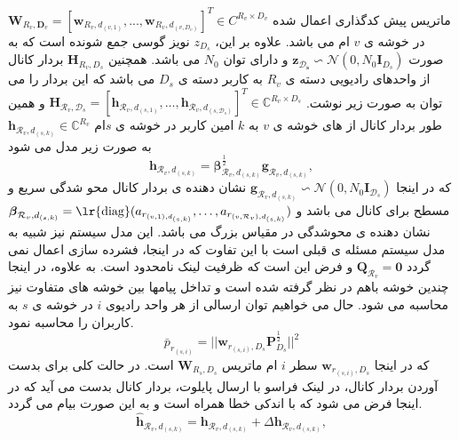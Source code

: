   $\boldsymbol{W}_{R_v, \boldsymbol{D}_v} = [\boldsymbol{w}_{ R_v,d_{(v,1)}},..., \boldsymbol{w}_{R_v, d_{(v,D_v)}}]^T \in C^{ R_v \times D_v} $ 
  ماتریس پیش کدگذاری اعمال شده در خوشه ی $v$ ام می باشد.
 علاوه بر این، $z_{D_s}$ نویز گوسی جمع شونده است که به صورت 
 $\boldsymbol{z_{\mathcal{D}_s}} \backsim \mathcal{N}(0,N_0\boldsymbol{I}_{{D}_s})$ 
و دارای توان $N_0$
می باشد.
همچنین $\boldsymbol{H}_{R_v,D_s}$ بردار کانال از واحدهای رادیویی دسته ی $R_v$ به کاربر دسته ی $D_s$ می باشد که این بردار را می توان به صورت زیر نوشت.
 $\boldsymbol{H}_{\mathcal{R}_v,\mathcal{D}_s}=\left[\boldsymbol{h}_{\mathcal{R}_v,d_{(s,1)}},\ldots,\boldsymbol{h}_{\mathcal{R}_v,d_{(s,\mathcal{D}_s)}}\right]^T  \in \mathbb{C}^{{R}_v\times {D}_s}$ 
 و همین طور
 بردار کانال از  های خوشه ی  $v$ به $k$ امین کاربر در خوشه ی $s$ام  
 $\boldsymbol{h}_{\mathcal{R}_v,d_{(s,k)}}\in \mathbb{C}^{{R}_v}$
 به صورت زیر مدل می شود
 \begin{equation}\label{channel}
\boldsymbol{h}_{\mathcal{R}_v,d_{(s,k)}} = \boldsymbol{\beta}^\frac{1}{2}_{\mathcal{R}_v,d_{(s,k)}} \boldsymbol{g}_{\mathcal{R}_v,d_{(s,k)}},
\end{equation}
که  در اینجا $\boldsymbol{g}_{\mathcal{R}_v,d_{(s,k)}} \backsim \mathcal{N}(0,N_0\boldsymbol{I}_{\mathcal{D}_s})$ نشان دهنده ی بردار کانال محو شدگی سریع و مسطح برای کانال می باشد 
و $\boldsymbol{\beta}_{\mathcal{R}_v,d_{(s,k)}}=\text{\lr{diag}}(a_{r_{(v,1),d_{(s,k)}}},\ldots,a_{r_{(v,\mathcal{R}_v),d_{(s,k)}}})$
نشان دهنده ی محوشدگی  در مقیاس بزرگ می باشد. 
این مدل سیستم نیز شبیه به  مدل سیستم مسئله ی قبلی است با این تفاوت که در اینجا، فشرده سازی اعمال نمی گردد  $\boldsymbol{Q}_{\mathcal{R}_v} = \boldsymbol{0}$ و فرض این است که ظرفیت لینک   نامحدود است. 
به علاوه، در اینجا چندین خوشه باهم در نظر گرفته شده است و تداخل پیامها بین خوشه های متفاوت نیز محاسبه می شود.\newline
حال می خواهیم توان ارسالی از هر واحد رادیوی $i$ در خوشه ی $s$ به کاربران را محاسبه نمود.
\begin{equation}
\bar{p}_{r_{(s,i)}} = || \boldsymbol{w}_{r_{(s,i)},D_s}\boldsymbol{P}_{{D}_s}^\frac{1}{2}  ||^2
\end{equation} 
که در اینجا
$\boldsymbol{w}_{r_{(s,i)},D_s}$
سطر $i$ ام ماتریس $\boldsymbol{W}_{R_s, {D}_s}$
است.\newline
در حالت کلی برای بدست آوردن بردار کانال، در لینک فراسو با ارسال پایلوت، بردار کانال بدست می آید که در اینجا فرض می شود که با اندکی خطا همراه است و به این صورت بیام می گردد.
\begin{equation*}
\hat{\boldsymbol{h}}_{\mathcal{R}_v,d_{(s,k)}} = \boldsymbol{h}_{\mathcal{R}_v,d_{(s,k)}} + \Delta \boldsymbol{h}_{\mathcal{R}_v,d_{(s,k)}},
\end{equation*}


